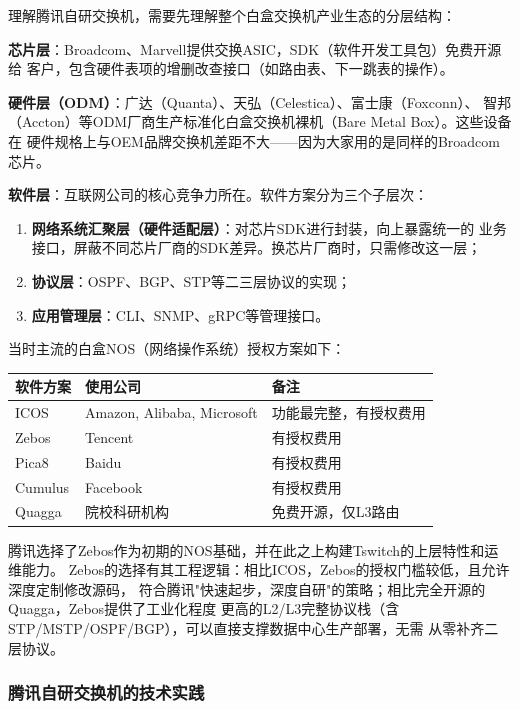 理解腾讯自研交换机，需要先理解整个白盒交换机产业生态的分层结构：

\textbf{芯片层}：Broadcom、Marvell提供交换ASIC，SDK（软件开发工具包）免费开源给
客户，包含硬件表项的增删改查接口（如路由表、下一跳表的操作）。

\textbf{硬件层（ODM）}：广达（Quanta）、天弘（Celestica）、富士康（Foxconn）、
智邦（Accton）等ODM厂商生产标准化白盒交换机裸机（Bare Metal Box）。这些设备在
硬件规格上与OEM品牌交换机差距不大——因为大家用的是同样的Broadcom芯片。

\textbf{软件层}：互联网公司的核心竞争力所在。软件方案分为三个子层次：
\begin{enumerate}
  \item \textbf{网络系统汇聚层（硬件适配层）}：对芯片SDK进行封装，向上暴露统一的
    业务接口，屏蔽不同芯片厂商的SDK差异。换芯片厂商时，只需修改这一层；
  \item \textbf{协议层}：OSPF、BGP、STP等二三层协议的实现；
  \item \textbf{应用管理层}：CLI、SNMP、gRPC等管理接口。
\end{enumerate}

当时主流的白盒NOS（网络操作系统）授权方案如下：

\begin{center}
\begin{tabular}{|l|l|l|}
\hline
\textbf{软件方案} & \textbf{使用公司} & \textbf{备注} \\
\hline
ICOS & Amazon, Alibaba, Microsoft & 功能最完整，有授权费用 \\
Zebos & Tencent & 有授权费用 \\
Pica8 & Baidu & 有授权费用 \\
Cumulus & Facebook & 有授权费用 \\
Quagga & 院校科研机构 & 免费开源，仅L3路由 \\
\hline
\end{tabular}
\end{center}

腾讯选择了Zebos作为初期的NOS基础，并在此之上构建Tswitch的上层特性和运维能力。
Zebos的选择有其工程逻辑：相比ICOS，Zebos的授权门槛较低，且允许深度定制修改源码，
符合腾讯"快速起步，深度自研"的策略；相比完全开源的Quagga，Zebos提供了工业化程度
更高的L2/L3完整协议栈（含STP/MSTP/OSPF/BGP），可以直接支撑数据中心生产部署，无需
从零补齐二层协议。

\subsubsection{腾讯自研交换机的技术实践}

